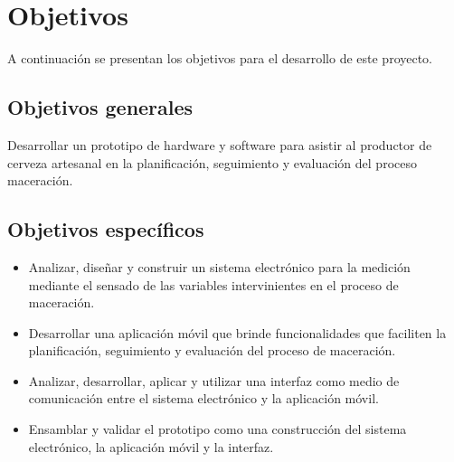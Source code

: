 \section{Objetivos}
\label{secccionObjetivos}
    \par
    A continuación se presentan los objetivos para el desarrollo de este proyecto.

    \subsection{Objetivos generales}
        \par
        Desarrollar un prototipo de hardware y software para asistir al productor de cerveza artesanal en la planificación, seguimiento y evaluación del proceso maceración. 
    \subsection{Objetivos específicos}
        \begin{itemize}
            \item Analizar, diseñar y construir un sistema electrónico para la medición mediante el sensado de las variables intervinientes en el proceso de maceración.
            
            \item Desarrollar una aplicación móvil que brinde funcionalidades que faciliten la planificación, seguimiento y evaluación del proceso de maceración.
            
            \item Analizar, desarrollar, aplicar y utilizar una interfaz como medio de comunicación entre el sistema electrónico y la aplicación móvil.
            
            \item Ensamblar y validar el prototipo como una construcción del sistema electrónico, la aplicación móvil y la interfaz.
        \end{itemize}
 
